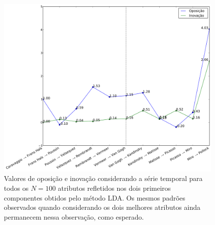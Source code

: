 \begin{figure}[h!]
\begin{center}
      \caption{Valores de oposição e inovação considerando a série temporal para
        todos os $N = 100$ atributos refletidos nos dois primeiros componentes
        obtidos pelo método LDA. Os mesmos padrões observados quando
        considerando os dois melhores atributos ainda permanecem nessa
        observação, como esperado.}
        \label{fig:caso3_oposEinov}
        \includegraphics[width=\columnwidth]{figs/caso3_oposEinov}
       \fonteminha
\end{center}
\end{figure}

